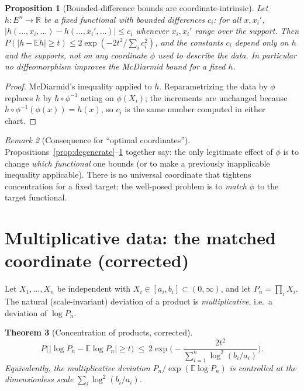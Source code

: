 \documentclass[11pt]{article}
\theoremstyle{plain}
\newtheorem{theorem}{Theorem}[section]
\newtheorem{proposition}[theorem]{Proposition}
\theoremstyle{definition}
\theoremstyle{remark}
\newtheorem{remark}[theorem]{Remark}
\newcommand{\R}{\mathbb{R}}
\newcommand{\E}{\mathbb{E}}
\begin{document}
\begin{proposition}[Bounded-difference bounds are coordinate-intrinsic]\label{prop:intrinsic}
Let $h:E^n\to\R$ be a fixed functional with bounded differences $c_i$: for all
$x,x_i'$,
$|h(\dots,x_i,\dots)-h(\dots,x_i',\dots)|\le c_i$ whenever $x_i,x_i'$ range over
the support. Then $P(|h-\E h|\ge t)\le 2\exp(-2t^2/\sum_i c_i^2)$, and the
constants $c_i$ depend only on $h$ and the supports, \emph{not} on any coordinate
$\phi$ used to describe the data. In particular no diffeomorphism improves the
McDiarmid bound for a fixed $h$.
\end{proposition}

\begin{proof}
McDiarmid's inequality applied to $h$. Reparametrizing the data by $\phi$ replaces
$h$ by $h\circ\phi^{-1}$ acting on $\phi(X_i)$; the increments are unchanged
because $h\circ\phi^{-1}(\phi(x))=h(x)$, so $c_i$ is the same number computed in
either chart.
\end{proof}

\begin{remark}[Consequence for ``optimal coordinates'']
Propositions~\ref{prop:degenerate}--\ref{prop:intrinsic} together say: the only
legitimate effect of $\phi$ is to change \emph{which functional} one bounds (or
to make a previously inapplicable inequality applicable). There is no universal
coordinate that tightens concentration for a fixed target; the well-posed problem
is to \emph{match} $\phi$ to the target functional.
\end{remark}

\section{Multiplicative data: the matched coordinate (corrected)}
\label{sec:multiplicative}

Let $X_1,\dots,X_n$ be independent with $X_i\in[a_i,b_i]\subset(0,\infty)$, and
let $P_n=\prod_i X_i$. The natural (scale-invariant) deviation of a product is
\emph{multiplicative}, i.e.\ a deviation of $\log P_n$.

\begin{theorem}[Concentration of products, corrected]\label{thm:product}
\[
P\big(|\log P_n-\E\log P_n|\ge t\big)\ \le\ 2\exp\!\Big(-\frac{2t^2}{\sum_{i=1}^n\log^2(b_i/a_i)}\Big).
\]
Equivalently, the multiplicative deviation $P_n/\exp(\E\log P_n)$ is controlled
at the dimensionless scale $\sum_i\log^2(b_i/a_i)$.
\end{theorem}
\end{document}
